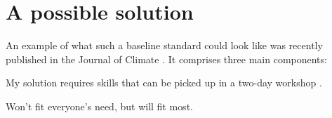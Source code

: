 \section{A possible solution}

An example of what such a baseline standard could look like was recently published in the Journal of Climate \citep{Irving2015}. It comprises three main components: 



My solution requires skills that can be picked up in a two-day workshop \citep{Wilson2014,Wilson2014a}.

Won't fit everyone's need, but will fit most.